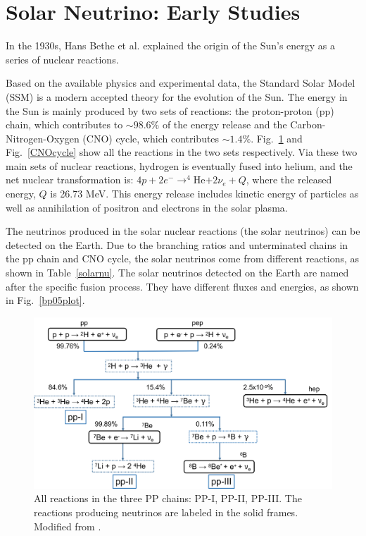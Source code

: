 \section{Solar Neutrino: Early Studies}
In the 1930s, Hans Bethe et al. explained the origin of the Sun's energy as a series of nuclear reactions\cite{bethe1939energy}.

Based on the available physics and experimental data, the Standard Solar Model (SSM) is a modern accepted theory for the evolution of the Sun. The energy in the Sun is mainly produced by two sets of reactions: the proton-proton (pp) chain, which contributes to $\sim 98.6\%$ of the energy release and the Carbon-Nitrogen-Oxygen (CNO) cycle, which contributes $\sim 1.4\%$. Fig.~\ref{ppChain} and Fig.~\ref{CNOcycle} show all the reactions in the two sets respectively. Via these two main sets of nuclear reactions, hydrogen is eventually fused into helium, and the net nuclear transformation is: $4p+2e^-\to^{4}$He$+2\nu_e+Q$, where the released energy, $Q$ is 26.73 MeV. This energy release includes kinetic energy of particles as well as annihilation of positron and electrons in the solar plasma\cite{antonio2018state}.

The neutrinos produced in the solar nuclear reactions (the solar neutrinos) can be detected on the Earth\cite{giunti2007fundamentals}. Due to the branching ratios and unterminated chains in the pp chain and CNO cycle, the solar neutrinos come from different reactions, as shown in Table~\ref{solarnu}. The solar neutrinos detected on the Earth are named after the specific fusion process\cite{haxton2013solar}. They have different fluxes and energies, as shown in Fig.~\ref{bp05plot}\cite{bahcall2005new}.

\begin{figure}[htbp]
	\centering	
	\includegraphics[width=14cm]{ppChain.png}
	\caption{All reactions in the three PP chains: PP-I, PP-II, PP-III. The reactions producing neutrinos are labeled in the solid frames. Modified from \cite{oberauer2020solar}.}
	\label{ppChain}
\end{figure}


